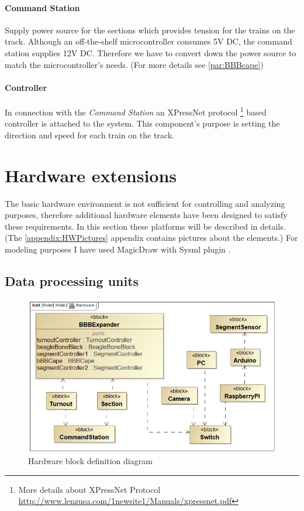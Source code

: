 \paragraph{Command Station} \label{basics:CS}
Supply power source for the sections which provides tension for the trains on the track. Although an off-the-shelf microcontroller consumes 5V DC, the command station supplies 12V DC. Therefore we have to convert down the power source to match the microcontroller's needs. (For more details see \autoref{par:BBBcape})


\paragraph{Controller}
In connection with the \textit{Command Station} an XPressNet protocol \footnote{More details about XPressNet Protocol \url{http://www.lenzusa.com/1newsite1/Manuals/xpressnet.pdf}} based controller is attached to the system. This component's purpose is setting the direction and speed for each train on the track.

\section{Hardware extensions}
The basic hardware environment is not sufficient for controlling and analyzing purposes, therefore additional hardware elements have been designed to satisfy these requirements. In this section these platforms will be described in details. (The \ref{appendix:HWPictures} appendix contains pictures about the elements.) For modeling purposes I have used MagicDraw with Sysml plugin \cite{SysML}.

\subsection{Data processing units}
\begin{figure}[ht]
	\centering
	\includegraphics[width=150mm]{figures/modes3/Hardware.png}
	\caption{Hardware block definition diagram}
	\label{fig:Modes3HWBDD}
\end{figure}


